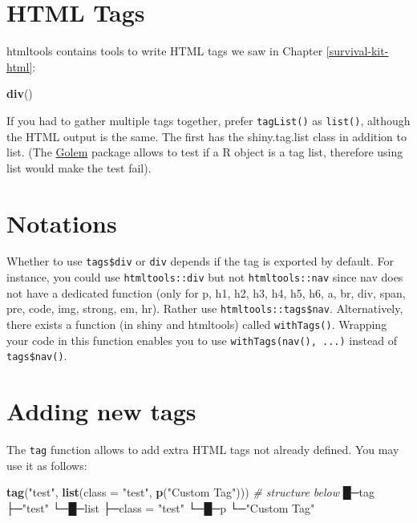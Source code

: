 \documentclass[]{book}
\newenvironment{Shaded}{\begin{snugshade}}{\end{snugshade}}
\newcommand{\CommentTok}[1]{\textcolor[rgb]{0.56,0.35,0.01}{\textit{#1}}}
\newcommand{\DataTypeTok}[1]{\textcolor[rgb]{0.13,0.29,0.53}{#1}}
\newcommand{\KeywordTok}[1]{\textcolor[rgb]{0.13,0.29,0.53}{\textbf{#1}}}
\newcommand{\NormalTok}[1]{#1}
\newcommand{\StringTok}[1]{\textcolor[rgb]{0.31,0.60,0.02}{#1}}
\begin{document}
\hypertarget{html-tags}{%
\section{HTML Tags}\label{html-tags}}

htmltools contains tools to write HTML tags we saw in Chapter \ref{survival-kit-html}:

\begin{Shaded}
\begin{Highlighting}[]
\KeywordTok{div}\NormalTok{()}
\end{Highlighting}
\end{Shaded}

If you had to gather multiple tags together, prefer \texttt{tagList()} as \texttt{list()}, although the HTML output is the same. The first has the shiny.tag.list class in addition to list. (The \href{http://golemverse.org}{Golem} package allows to test if a R object is a tag list, therefore using list would make the test fail).

\hypertarget{notations}{%
\section{Notations}\label{notations}}

Whether to use \texttt{tags\$div} or \texttt{div} depends if the tag is exported by default.
For instance, you could use \texttt{htmltools::div} but not \texttt{htmltools::nav} since nav does not have a dedicated function (only for p, h1, h2, h3, h4, h5, h6, a, br, div, span, pre, code, img, strong, em, hr).
Rather use \texttt{htmltools::tags\$nav}. Alternatively, there exists a function (in shiny and htmltools)
called \texttt{withTags()}. Wrapping your code in this function enables you to use \texttt{withTags(nav(),\ ...)}
instead of \texttt{tags\$nav()}.

\hypertarget{adding-new-tags}{%
\section{Adding new tags}\label{adding-new-tags}}

The \texttt{tag} function allows to add extra HTML tags not already defined. You may use it as follows:

\begin{Shaded}
\begin{Highlighting}[]
\KeywordTok{tag}\NormalTok{(}\StringTok{"test"}\NormalTok{, }\KeywordTok{list}\NormalTok{(}\DataTypeTok{class =} \StringTok{"test"}\NormalTok{, }\KeywordTok{p}\NormalTok{(}\StringTok{"Custom Tag"}\NormalTok{)))}
\CommentTok{# structure below}
\NormalTok{█─tag }
\NormalTok{├─}\StringTok{"test"} 
\NormalTok{└─█─list }
\NormalTok{├─class =}\StringTok{ "test"} 
\NormalTok{└─█─p }
\NormalTok{└─}\StringTok{"Custom Tag"} 
\end{Highlighting}
\end{Shaded}
\end{document}
